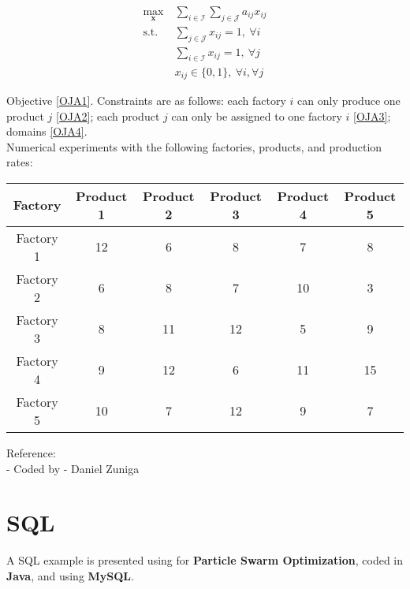 \documentclass[10pt,bezier]{article}
\begin{document}
\begin{subequations}\label{OJA}
    \begin{align}
    \max_{\pmb{x}} ~& \sum_{i \in \mathcal{I}} \sum_{j \in \mathcal{J}} a_{ij} x_{ij} \label{OJA1}\\
    \text{s.t. } & \sum_{j \in \mathcal{J}} x_{ij} = 1,~ \forall i \label{OJA2}\\
                 & \sum_{i \in \mathcal{I}} x_{ij} = 1,~ \forall j \label{OJA3}\\
                 & x_{ij} \in \{0,1\},~\forall i, \forall j \label{OJA4}
    \end{align}
\end{subequations}

Objective \eqref{OJA1}. Constraints are as follows: each factory $i$ can only produce one product $j$ \eqref{OJA2}; each product $j$ can only be assigned to one factory $i$ \eqref{OJA3}; domains \eqref{OJA4}.\\

Numerical experiments with the following factories, products, and production rates:
\begin{table}[!htbp]
    \centering
    \begin{tabular}{c | c c c c c }
        Factory & Product 1 & Product 2 & Product 3 & Product 4 & Product 5\\ \hline
        Factory 1 & 12 & 6 & 8 & 7 & 8\\
        Factory 2 & 6 & 8 & 7 & 10 & 3\\
        Factory 3 & 8 & 11 & 12 & 5 & 9\\
        Factory 4 & 9 & 12 & 6 & 11 & 15\\
        Factory 5 & 10 & 7 & 12 & 9 & 7
    \end{tabular}
\end{table}

\noindent Reference:\\
- Coded by - Daniel Zuniga

\newpage
\section{SQL}\label{section8}

A SQL example is presented using for {\color{blue}\textbf{Particle Swarm Optimization}}, coded in {\color{blue}\textbf{Java}}, and using {\color{blue}\textbf{MySQL}}.
\end{document}
